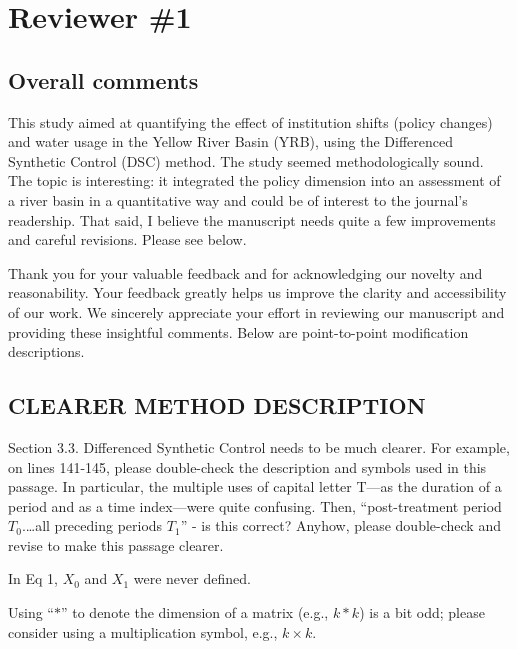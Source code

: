 \section{Reviewer \#1}\label{reviewer_1}

\subsection*{Overall comments}

\RC{} This study aimed at quantifying the effect of institution shifts (policy changes) and water usage in the Yellow River Basin (YRB), using the Differenced Synthetic Control (DSC) method. The study seemed methodologically sound. The topic is interesting: it integrated the policy dimension into an assessment of a river basin in a quantitative way and could be of interest to the journal's readership. That said, I believe the manuscript needs quite a few improvements and careful revisions. Please see below.

\AR{} Thank you for your valuable feedback and for acknowledging our novelty and reasonability. Your feedback greatly helps us improve the clarity and accessibility of our work. We sincerely appreciate your effort in reviewing our manuscript and providing these insightful comments. Below are point-to-point modification descriptions.

\subsection{CLEARER METHOD DESCRIPTION}\label{sec:1-1}

\RC{} Section 3.3. Differenced Synthetic Control needs to be much clearer. For example, on lines 141-145, please double-check the description and symbols used in this passage. In particular, the multiple uses of capital letter T—as the duration of a period and as a time index—were quite confusing. Then, ``post-treatment period $T_0$.\ldots all preceding periods $T_1$'' - is this correct? Anyhow, please double-check and revise to make this passage clearer.

\RC{} In Eq 1, $X_0$ and $X_1$ were never defined.

\RC{} Using ``$*$'' to denote the dimension of a matrix (e.g., $k*k$) is a bit odd; please consider using a multiplication symbol, e.g., $k \times k$.

